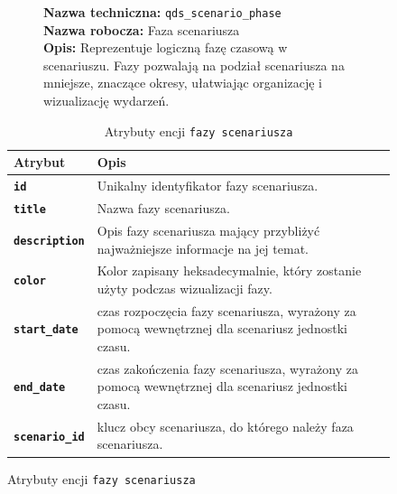\begin{figure}[H]
    \begin{minipage}{\textwidth}
        \centering
        \begin{figure}[H]
            \centering
            \begin{minipage}{0.8\textwidth}
                \begin{framed}
                    \noindent\textbf{\large Nazwa techniczna:} \texttt{qds\_scenario\_phase} \\
                    \textbf{\large Nazwa robocza:} Faza scenariusza \\
                    \textbf{\large Opis:} Reprezentuje logiczną fazę czasową w scenariuszu.
                    Fazy pozwalają na podział scenariusza na mniejsze, znaczące okresy, ułatwiając organizację i wizualizację wydarzeń.
                \end{framed}
            \end{minipage}
        \end{figure}

        \begin{table}[H]
            \centering
            \renewcommand{\arraystretch}{1.6}
            \begin{tabular}{|>{\bfseries}l|p{}|}
                \hline
                \rowcolor[HTML]{EFEFEF} \textbf{Atrybut} & \textbf{Opis} \\
                \hline
                \texttt{id} & Unikalny identyfikator fazy scenariusza. \\
                \hline
                \texttt{title} & Nazwa fazy scenariusza. \\
                \hline
                \texttt{description} & Opis fazy scenariusza mający przybliżyć najważniejsze informacje na jej temat. \\
                \hline
                \texttt{color} & Kolor zapisany heksadecymalnie, który zostanie użyty podczas wizualizacji fazy. \\
                \hline
                \texttt{start\_date} & czas rozpoczęcia fazy scenariusza, wyrażony za pomocą wewnętrznej dla scenariusz jednostki czasu. \\
                \hline
                \texttt{end\_date} & czas zakończenia fazy scenariusza, wyrażony za pomocą wewnętrznej dla scenariusz jednostki czasu. \\
                \hline
                \texttt{scenario\_id} & klucz obcy scenariusza, do którego należy faza scenariusza. \\
                \hline
            \end{tabular}
            \caption{Atrybuty encji \texttt{fazy scenariusza}}
        \end{table}
    \end{minipage}
\end{figure}

